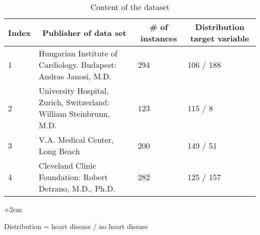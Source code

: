 \documentclass[11pt,titlepage,oneside,openany]{article}
\begin{document}
\begin{table}[]
\begin{adjustwidth}{-2cm}{}
\begin{footnotesize}
\begin{tabular}{|l|l|l|l|}
\hline
\textbf{Index} & \multicolumn{1}{c|}{\textbf{Publisher of data set}}                & \multicolumn{1}{c|}{\textbf{\# of instances}} & \multicolumn{1}{c|}{\textbf{Distribution target variable}} \\ \hline
1              & Hungarian Institute of Cardiology. Budapest: Andras Janosi, M.D.   & 294                                           & 106 / 188                                                                                          \\ \hline
2              & University Hospital, Zurich, Switzerland: William Steinbrunn, M.D. & 123                                           & 115 / 8                                                                                            \\ \hline
3              & V.A. Medical Center, Long Beach                                    & 200                                           & 149 / 51                                                                                           \\ \hline
4              & Cleveland Clinic Foundation: Robert Detrano, M.D., Ph.D.           & 282                                           & 125 / 157                                                                                          \\ \hline
\end{tabular}
\begin{adjustwidth}{+2cm}{}
\begin{center}
\centering
Distribution = heart disease / no heart disease
\end{center}
\end{adjustwidth}

\caption{Content of the dataset} 
\label{table:datasets}
\end{footnotesize}
\end{adjustwidth}
\end{table}
\end{document}
